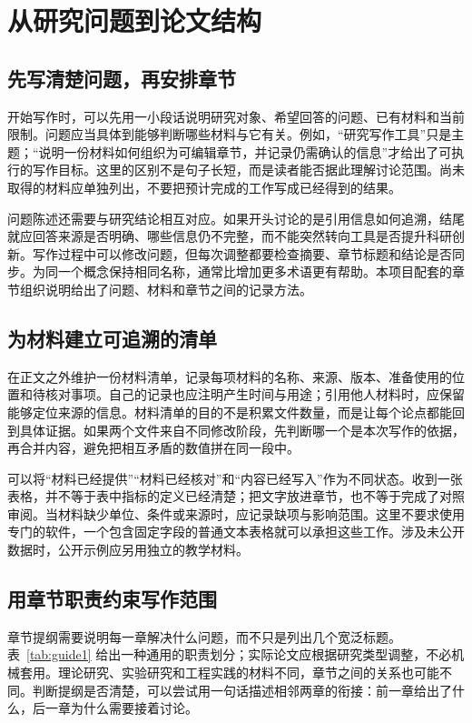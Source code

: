 \chapter{从研究问题到论文结构}
\label{chap:guide1}

\section{先写清楚问题，再安排章节}

开始写作时，可以先用一小段话说明研究对象、希望回答的问题、已有材料和当前限制。问题应当具体到能够判断哪些材料与它有关。例如，“研究写作工具”只是主题；“说明一份材料如何组织为可编辑章节，并记录仍需确认的信息”才给出了可执行的写作目标。这里的区别不是句子长短，而是读者能否据此理解讨论范围。尚未取得的材料应单独列出，不要把预计完成的工作写成已经得到的结果。

问题陈述还需要与研究结论相互对应。如果开头讨论的是引用信息如何追溯，结尾就应回答来源是否明确、哪些信息仍不完整，而不能突然转向工具是否提升科研创新。写作过程中可以修改问题，但每次调整都要检查摘要、章节标题和结论是否同步。为同一个概念保持相同名称，通常比增加更多术语更有帮助。本项目配套的章节组织说明给出了问题、材料和章节之间的记录方法。\cite{guide1}

\section{为材料建立可追溯的清单}

在正文之外维护一份材料清单，记录每项材料的名称、来源、版本、准备使用的位置和待核对事项。自己的记录也应注明产生时间与用途；引用他人材料时，应保留能够定位来源的信息。材料清单的目的不是积累文件数量，而是让每个论点都能回到具体证据。如果两个文件来自不同修改阶段，先判断哪一个是本次写作的依据，再合并内容，避免把相互矛盾的数值拼在同一段中。

可以将“材料已经提供”“材料已经核对”和“内容已经写入”作为不同状态。收到一张表格，并不等于表中指标的定义已经清楚；把文字放进章节，也不等于完成了对照审阅。当材料缺少单位、条件或来源时，应记录缺项与影响范围。这里不要求使用专门的软件，一个包含固定字段的普通文本表格就可以承担这些工作。涉及未公开数据时，公开示例应另用独立的教学材料。

\section{用章节职责约束写作范围}

章节提纲需要说明每一章解决什么问题，而不只是列出几个宽泛标题。表~\ref{tab:guide1} 给出一种通用的职责划分；实际论文应根据研究类型调整，不必机械套用。理论研究、实验研究和工程实践的材料不同，章节之间的关系也可能不同。判断提纲是否清楚，可以尝试用一句话描述相邻两章的衔接：前一章给出了什么，后一章为什么需要接着讨论。

